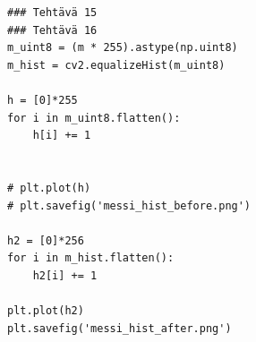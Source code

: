 \documentclass{article}
\begin{document}
\begin{verbatim}
### Tehtävä 15
### Tehtävä 16
m_uint8 = (m * 255).astype(np.uint8)
m_hist = cv2.equalizeHist(m_uint8)

h = [0]*255
for i in m_uint8.flatten():
    h[i] += 1
    

# plt.plot(h)
# plt.savefig('messi_hist_before.png')

h2 = [0]*256
for i in m_hist.flatten():
    h2[i] += 1

plt.plot(h2)
plt.savefig('messi_hist_after.png')
\end{verbatim}
\end{document}
